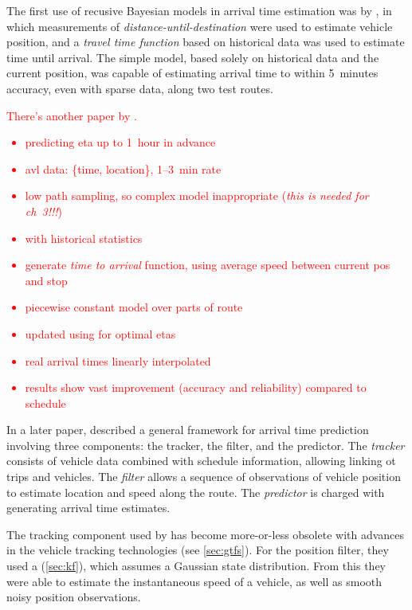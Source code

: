 The first use of recusive Bayesian models in arrival time estimation
was by \cite{Wall_1999},
in which measurements of \emph{distance-until-destination}
were used to estimate vehicle position,
and a \emph{travel time function} based on historical data
was used to estimate time until arrival.
The simple model, based solely on historical data and the current position,
was capable of estimating arrival time to within 5~minutes accuracy,
even with sparse data,
along two test routes.

\textcolor{red}{
    \singlespacing
    There's another paper by \cite{Dailey_2001}.
    \begin{itemize}
        \item predicting \gls{eta} up to 1~hour in advance
        \item \gls{avl} data: \{time, location\}, 1--3~min rate
        \item low path sampling, so complex model inappropriate
            (\emph{this is needed for ch~3!!!})
        \item with historical statistics
        \item generate \emph{time to arrival} function,
            using average speed between current pos and stop
        \item piecewise constant model over parts of route
        \item updated using \kf{} for optimal \glspl{eta}
        \item real arrival times linearly interpolated
        \item results show vast improvement (accuracy and reliability)
            compared to schedule
    \end{itemize}
}

In a later paper,
\cite{Cathey_2003} described a general framework for arrival time prediction
involving three components:
the tracker, the filter, and the predictor.
The \emph{tracker} consists of vehicle data combined with schedule information,
allowing linking ot trips and vehicles.
The \emph{filter} allows a sequence of \rt{} observations of vehicle position
to estimate location and speed along the route.
The \emph{predictor} is charged with generating arrival time estimates.


The tracking component used by \cite{Cathey_2003} has become more-or-less obsolete
with advances in the vehicle tracking technologies
(see \cref{sec:gtfs}).
For the position filter, they used a \kf{} (\cref{sec:kf}),
which assumes a Gaussian state distribution.
From this they were able to estimate the instantaneous speed of a vehicle,
as well as smooth noisy position observations.


